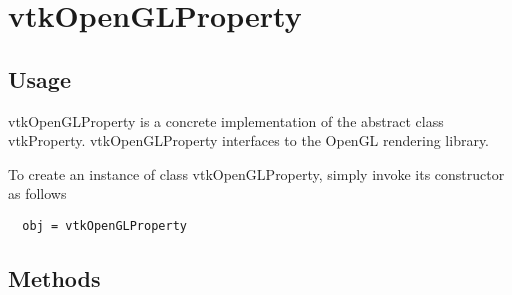 \section{vtkOpenGLProperty}

\subsection{Usage}

 vtkOpenGLProperty is a concrete implementation of the abstract class 
 vtkProperty. vtkOpenGLProperty interfaces to the OpenGL rendering library.

To create an instance of class vtkOpenGLProperty, simply
invoke its constructor as follows
\begin{verbatim}
  obj = vtkOpenGLProperty
\end{verbatim}
\subsection{Methods}

